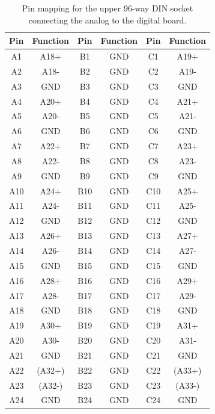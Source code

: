 \documentclass[a4paper]{article}
\begin{document}
\begin{table}[h]
    \begin{center}
        \caption{Pin mapping for the upper 96-way DIN socket connecting the analog to the digital board.}
        \label{tab:DIN96Lower}
        \begin{tabular}{cc|cc|cc}
            \hline
            \hline
            Pin & Function & Pin & Function & Pin & Function \\
            \hline
            A1 & A18+ & B1 & GND & C1 & A19+ \\
            A2 & A18- & B2 & GND & C2 & A19- \\
            A3 & GND & B3 & GND & C3 & GND \\
            A4 & A20+ & B4 & GND & C4 & A21+ \\
            A5 & A20- & B5 & GND & C5 & A21- \\
            A6 & GND & B6 & GND & C6 & GND \\
            A7 & A22+ & B7 & GND & C7 & A23+ \\
            A8 & A22- & B8 & GND & C8 & A23- \\
            A9 & GND & B9 & GND & C9 & GND \\
            A10 & A24+ & B10 & GND & C10 & A25+ \\
            A11 & A24- & B11 & GND & C11 & A25- \\
            A12 & GND & B12 & GND & C12 & GND \\
            A13 & A26+ & B13 & GND & C13 & A27+ \\
            A14 & A26- & B14 & GND & C14 & A27- \\
            A15 & GND & B15 & GND & C15 & GND \\
            A16 & A28+ & B16 & GND & C16 & A29+ \\
            A17 & A28- & B17 & GND & C17 & A29- \\
            A18 & GND & B18 & GND & C18 & GND \\
            A19 & A30+ & B19 & GND & C19 & A31+ \\
            A20 & A30- & B20 & GND & C20 & A31- \\
            A21 & GND & B21 & GND & C21 & GND \\
            A22 & (A32+) & B22 & GND & C22 & (A33+) \\
            A23 & (A32-) & B23 & GND & C23 & (A33-) \\
            A24 & GND & B24 & GND & C24 & GND \\

\end{tabular}
\end{center}
\end{table}
\end{document}
